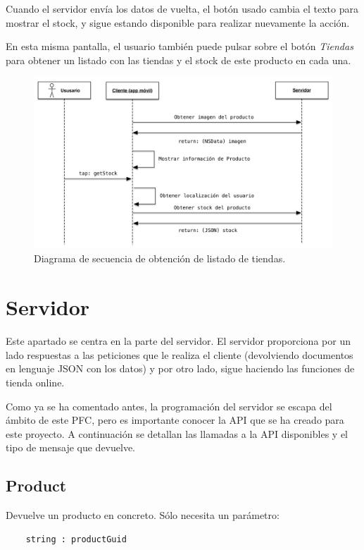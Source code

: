 Cuando el servidor envía los datos de vuelta, el botón usado cambia el texto para mostrar el stock, y sigue estando disponible para realizar nuevamente la acción.

En esta misma pantalla, el usuario también puede pulsar sobre el botón \emph{Tiendas} para obtener un listado con las tiendas y el stock de este producto en cada una.

\begin{figure}[H]
	\centering
		\includegraphics[width=1\textwidth]{./img/diagrama-get-stock.png}
	\caption{Diagrama de secuencia de obtención de listado de tiendas.}
	\label{fig:diagrama-tiendas}
\end{figure}

\section{Servidor}
Este apartado se centra en la parte del servidor. El servidor proporciona por un lado respuestas a las peticiones que le realiza el cliente (devolviendo documentos en lenguaje JSON con los datos) y por otro lado, sigue haciendo las funciones de tienda online.

Como ya se ha comentado antes, la programación del servidor se escapa del ámbito de este PFC, pero es importante conocer la API que se ha creado para este proyecto. A continuación se detallan las llamadas a la API disponibles y el tipo de mensaje que devuelve.

\subsection{Product}
Devuelve un producto en concreto. Sólo necesita un parámetro:

\begin{lstlisting}
	string : productGuid
\end{lstlisting}

